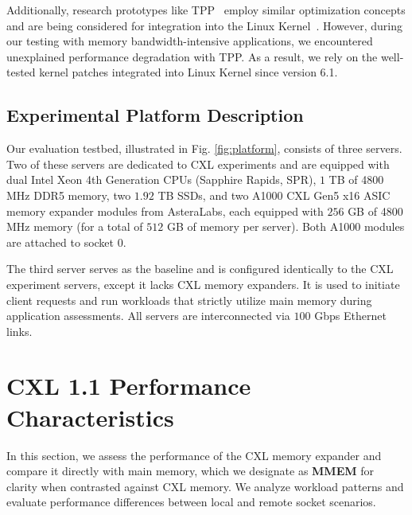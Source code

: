 Additionally, research prototypes like TPP~\cite{tpp} employ similar optimization concepts and are being considered for integration into the Linux Kernel~\cite{tpppatch}. However, during our testing with memory bandwidth-intensive applications, we encountered unexplained performance degradation with TPP. As a result, we rely on the well-tested kernel patches integrated into Linux Kernel since version 6.1.

\subsection{Experimental Platform Description}
Our evaluation testbed, illustrated in Fig. \ref{fig:platform}, consists of three servers. Two of these servers are dedicated to CXL experiments and are equipped with dual Intel Xeon 4th Generation CPUs (Sapphire Rapids, SPR), $1$ TB of 4800 MHz DDR5 memory, two $1.92$ TB SSDs, and two A1000 CXL Gen5 x16 ASIC memory expander modules from AsteraLabs, each equipped with $256$ GB of 4800 MHz memory (for a total of $512$ GB of memory per server). Both A1000 modules are attached to socket $0$. 

The third server serves as the baseline and is configured identically to the CXL experiment servers, except it lacks CXL memory expanders. It is used to initiate client requests and run workloads that strictly utilize main memory during application assessments. All servers are interconnected via $100$ Gbps Ethernet links.









\section{CXL 1.1 Performance Characteristics}
\label{sec:micro}

In this section, we assess the performance of the CXL memory expander and compare it directly with main memory, which we designate as \textbf{MMEM} for clarity when contrasted against CXL memory. We analyze workload patterns and evaluate performance differences between local and remote socket scenarios.

